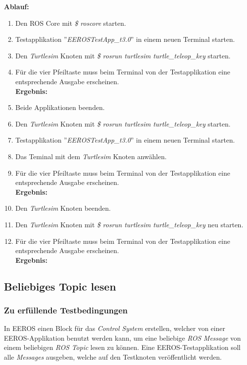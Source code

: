 \textbf{Ablauf: } 
\begin{enumerate}
\item Den ROS Core mit \textit{\$ roscore} starten.
\item Testapplikation ''\textit{EEROSTestApp\_t3.0}'' in einem neuen Terminal starten.
\item Den \textit{Turtlesim} Knoten mit \textit{\$ rosrun turtlesim turtle\_teleop\_key} starten.
\item Für die vier Pfeiltaste muss beim Terminal von der Testapplikation eine entsprechende Ausgabe erscheinen. \\
\textbf{Ergebnis:} \checkmark
\item Beide Applikationen beenden.
\item Den \textit{Turtlesim} Knoten mit \textit{\$ rosrun turtlesim turtle\_teleop\_key} starten.
\item Testapplikation ''\textit{EEROSTestApp\_t3.0}'' in einem neuen Terminal starten.
\item Das Teminal mit dem \textit{Turtlesim} Knoten anwählen.
\item Für die vier Pfeiltaste muss beim Terminal von der Testapplikation eine entsprechende Ausgabe erscheinen. \\
\textbf{Ergebnis:} \checkmark
\item Den \textit{Turtlesim} Knoten beenden.
\item Den \textit{Turtlesim} Knoten mit \textit{\$ rosrun turtlesim turtle\_teleop\_key} neu starten.
\item Für die vier Pfeiltaste muss beim Terminal von der Testapplikation eine entsprechende Ausgabe erscheinen. \\
\textbf{Ergebnis:} \checkmark
\end{enumerate}


\subsection{Beliebiges Topic lesen}
\subsubsection{Zu erfüllende Testbedingungen}
In EEROS einen Block für das \textit{Control System} erstellen, welcher von einer EEROS-Applikation benutzt werden kann, um eine beliebige \textit{ROS Message} von einem beliebigen \textit{ROS Topic} lesen zu können.
Eine EEROS-Testapplikation soll alle \textit{Messages} ausgeben, welche auf den Testknoten veröffentlicht werden.

